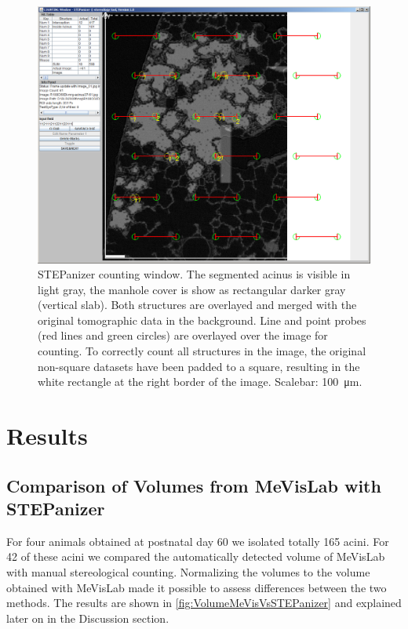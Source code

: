 \documentclass[%
	paper=a4,%
	abstract=true,%
	]{scrartcl}
\newcommand{\imsize}{\linewidth}
\begin{document}
\renewcommand{\imsize}{\linewidth}%
\begin{figure}
	\centering
	\includegraphics[width=\imsize]{img/CountingWindowSTEPanizer}
	\caption{STEPanizer counting window. The segmented acinus is visible in light gray, the manhole cover is show as rectangular darker gray (vertical slab). Both structures are overlayed and merged with the original tomographic data in the background. Line and point probes (red lines and green circles) are overlayed over the image for counting. To correctly count all structures in the image, the original non-square datasets have been padded to a square, resulting in the white rectangle at the right border of the image. Scalebar: \SI{100}{\micro\meter}.}
	\label{fig:STEPanizer}
\end{figure}

\section{Results}
\subsection{Comparison of Volumes from MeVisLab with STEPanizer}
For four animals obtained at postnatal day 60 we isolated totally 165 acini. For 42 of these acini  we compared the automatically detected volume of MeVisLab with manual stereological counting. Normalizing the volumes to the volume obtained with MeVisLab made it possible to assess differences between the two methods. The results are shown in \autoref{fig:VolumeMeVisVsSTEPanizer}  and explained later on in the Discussion section.
\end{document}
